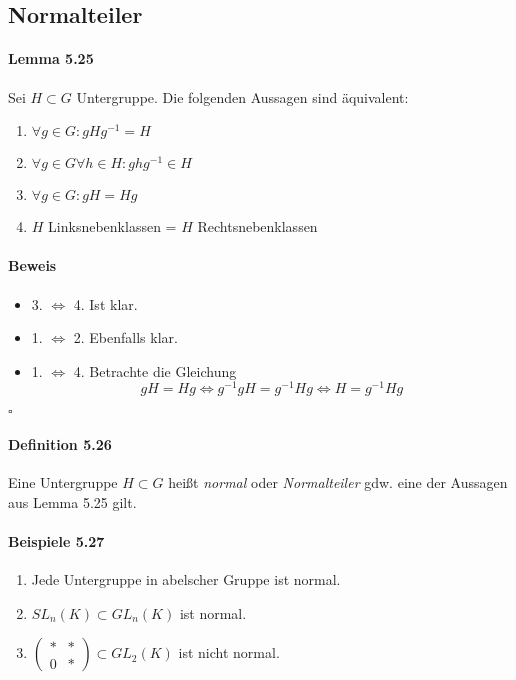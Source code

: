 \documentclass{scrartcl}
\begin{document}
\subsection{Normalteiler}
\label{subsec:normalteiler}

\paragraph{Lemma 5.25} Sei $H \subset G$ Untergruppe. Die folgenden Aussagen
sind äquivalent:
\begin{enumerate}
\item $\forall g \in G: gHg^{-1} = H$
\item $\forall g \in G \forall h \in H: ghg^{-1} \in H$
\item $\forall g \in G: gH = Hg$
\item $H$ Linksnebenklassen = $H$ Rechtsnebenklassen
\end{enumerate}
\paragraph{Beweis}
\begin{itemize}{}
\item 3. $\iff$ 4. Ist klar.
\item 1. $\iff$ 2. Ebenfalls klar.
\item 1. $\iff$ 4. Betrachte die Gleichung
  \[
    gH = Hg \iff g^{-1}gH=g^{-1}Hg \iff H = g^{-1}Hg
  \]
\end{itemize}
\hfill $\square$

\paragraph{Definition 5.26} Eine Untergruppe $H \subset G$ heißt \textit{normal}
oder \textit{Normalteiler} gdw. eine der Aussagen aus Lemma 5.25 gilt.

\paragraph{Beispiele 5.27}
\begin{enumerate}
\item Jede Untergruppe in abelscher Gruppe ist normal.
\item $SL_n(K) \subset GL_n(K)$ ist normal.
\item $
  \begin{pmatrix}
    * & * \\
    0 & *
  \end{pmatrix} \subset GL_2(K)
  $ ist nicht normal.
\end{enumerate}
\end{document}
